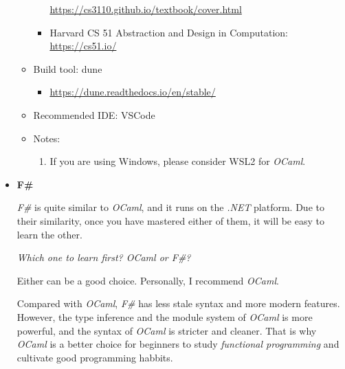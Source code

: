 \documentclass{article}
\begin{document}
\begin{itemize}
\begin{itemize}
\begin{itemize}
            \href{https://cs3110.github.io/textbook/cover.html}{https://cs3110.github.io/textbook/cover.html}
            \item Harvard CS 51
            Abstraction and Design in Computation:\\
            \href{https://cs51.io/}{https://cs51.io/}
        \end{itemize}
        \item Build tool:
        dune
        \begin{itemize}
            \item \href{https://dune.readthedocs.io/en/stable/}{https://dune.readthedocs.io/en/stable/}
        \end{itemize}
        \item Recommended IDE:
        VSCode
        \item Notes:
        \begin{enumerate}
            \item If you are using Windows, please consider WSL2 for \emph{OCaml}.
        \end{enumerate}
    \end{itemize}
    
    \item \textbf{F\#}
    
    \emph{F\#} is quite similar to \emph{OCaml}, and it runs on the \emph{.NET} platform.
    Due to their similarity, once you have mastered either of them, it will be easy to learn the other.
    
    \emph{Which one to learn first? OCaml or F\#?}
    
    Either can be a good choice.
    Personally, I recommend \emph{OCaml}.
    
    Compared with \emph{OCaml}, \emph{F\#} has less stale syntax and more modern features.
    However, the type inference and the module system of \emph{OCaml} is more powerful, and the syntax of \emph{OCaml} is stricter and cleaner.
    That is why \emph{OCaml} is a better choice for beginners to study \emph{functional programming} and cultivate good programming habbits.
    

\end{itemize}
\end{document}
